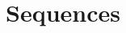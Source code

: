 \documentclass[t,usenames,dvipsnames]{beamer}
\title{Sequences}
\author{}
\date{}
\begin{document}
\begin{frame}
    \maketitle
\end{frame}










\end{document}
